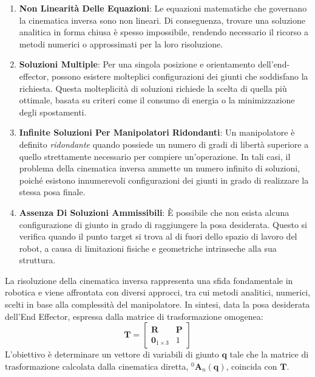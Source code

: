 \documentclass[11pt, a4paper]{report}
\begin{document}
\begin{enumerate}
    \item \textbf{Non Linearità Delle Equazioni}: Le equazioni matematiche che governano la cinematica inversa sono non lineari. Di conseguenza, trovare una soluzione analitica in forma chiusa è spesso impossibile, rendendo necessario il ricorso a metodi numerici o approssimati per la loro risoluzione.

    \item \textbf{Soluzioni Multiple}: Per una singola posizione e orientamento dell'end-effector, possono esistere molteplici configurazioni dei giunti che soddisfano la richiesta. Questa molteplicità di soluzioni richiede la scelta di quella più ottimale, basata su criteri come il consumo di energia o la minimizzazione degli spostamenti.

    \item \textbf{Infinite Soluzioni Per Manipolatori Ridondanti}: Un manipolatore è definito \textit{ridondante} quando possiede un numero di gradi di libertà superiore a quello strettamente necessario per compiere un'operazione. In tali casi, il problema della cinematica inversa ammette un numero infinito di soluzioni, poiché esistono innumerevoli configurazioni dei giunti in grado di realizzare la stessa posa finale.

    \item \textbf{Assenza Di Soluzioni Ammissibili}: È possibile che non esista alcuna configurazione di giunto in grado di raggiungere la posa desiderata. Questo si verifica quando il punto target si trova al di fuori dello spazio di lavoro del robot, a causa di limitazioni fisiche e geometriche intrinseche alla sua struttura.
\end{enumerate}

La risoluzione della cinematica inversa rappresenta una sfida fondamentale in robotica e viene affrontata con diversi approcci, tra cui metodi analitici, numerici, scelti in base alla complessità del manipolatore. In sintesi, data la posa desiderata dell'End Effector, espressa dalla matrice di trasformazione omogenea:
\[
    \bm{T} =
    \begin{bmatrix}
        \bm{R} & \bm{P}\\
        \bm{0}_{1\times 3} & 1
    \end{bmatrix}
\]
L'obiettivo è determinare un vettore di variabili di giunto \( \mathbf{q} \) tale che la matrice di trasformazione calcolata dalla cinematica diretta, \(^{0}\bm{A}_{n}(\mathbf{q})\), coincida con \(\bm{T}\).
\end{document}
